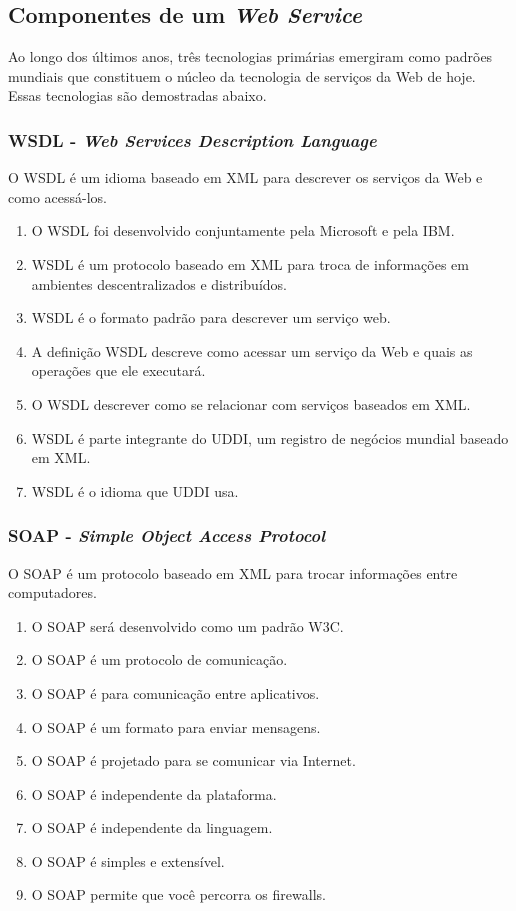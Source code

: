 \documentclass[12pt]{article}
\begin{document}
\subsection{Componentes de um \textit{Web Service}}
Ao longo dos últimos anos, três tecnologias primárias emergiram como padrões mundiais que constituem o núcleo da tecnologia de serviços da Web de hoje. Essas tecnologias são demostradas abaixo.


\subsubsection{WSDL - \textit{Web Services Description Language} }
O WSDL é um idioma baseado em XML para descrever os serviços da Web e como acessá-los.

\begin{enumerate}
	\item O WSDL foi desenvolvido conjuntamente pela Microsoft e pela IBM.
	\item WSDL é um protocolo baseado em XML para troca de informações em ambientes descentralizados e distribuídos.
	\item WSDL é o formato padrão para descrever um serviço web.
	\item A definição WSDL descreve como acessar um serviço da Web e quais as operações que ele executará.
	\item O WSDL descrever como se relacionar com serviços baseados em XML.
	\item WSDL é parte integrante do UDDI, um registro de negócios mundial baseado em XML.
	\item WSDL é o idioma que UDDI usa.
	
\end{enumerate}

\subsubsection{SOAP - \textit{Simple Object Access Protocol}}
O SOAP é um protocolo baseado em XML para trocar informações entre computadores.

\begin{enumerate}
	\item O SOAP será desenvolvido como um padrão W3C.
	\item O SOAP é um protocolo de comunicação.
	\item O SOAP é para comunicação entre aplicativos.
	\item O SOAP é um formato para enviar mensagens.
	\item O SOAP é projetado para se comunicar via Internet.
	\item O SOAP é independente da plataforma.
	\item O SOAP é independente da linguagem.
	\item O SOAP é simples e extensível.
	\item O SOAP permite que você percorra os firewalls.
\end{enumerate}
\end{document}
